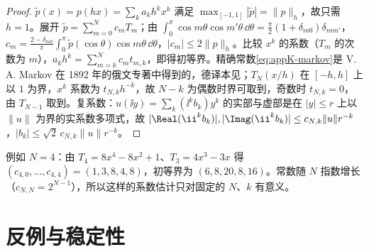 \begin{proof}
$\tilde p(x)=p(hx)=\sum_ka_kh^kx^k$ 满足 $\max_{[-1,1]}|\tilde p|=\|p\|_h$，故只需 $h=1$。展开 $\tilde p=\sum_{m=0}^Nc_mT_m$；由 $\int_0^\pi\cos m\theta\cos m'\theta\,\dd\theta=\frac\pi2(1+\delta_{m0})\delta_{mm'}$，$c_m=\frac{2-\delta_{m0}}{\pi}\int_0^\pi\tilde p(\cos\theta)\cos m\theta\,\dd\theta$，$|c_m|\le2\|p\|_h$。比较 $x^k$ 的系数（$T_m$ 的次数为 $m$），$a_kh^k=\sum_{m=k}^Nc_mt_{m,k}$，即得初等界。精确常数\cref{eq:appK-markov}是 V. A. Markov 在 1892 年的俄文专著中得到的，德译本见\cite{Markoff1916}；$T_N(x/h)$ 在 $[-h,h]$ 上以 $1$ 为界，$x^k$ 系数为 $t_{N,k}h^{-k}$，故 $N-k$ 为偶数时界可取到，奇数时 $t_{N,k}=0$，由 $T_{N-1}$ 取到。复系数：$u(\ii y)=\sum_k(\ii^kb_k)y^k$ 的实部与虚部是在 $|y|\le r$ 上以 $\|u\|$ 为界的实系数多项式，故 $|\Real(\ii^kb_k)|,|\Imag(\ii^kb_k)|\le c_{N,k}\|u\|r^{-k}$，$|b_k|\le\sqrt2\,c_{N,k}\|u\|r^{-k}$。
\end{proof}

例如 $N=4$：由 $T_4=8x^4-8x^2+1$、$T_3=4x^3-3x$ 得 $(c_{4,0},\dots,c_{4,4})=(1,3,8,4,8)$，初等界为 $(6,8,20,8,16)$。常数随 $N$ 指数增长（$c_{N,N}=2^{N-1}$），所以这样的系数估计只对固定的 $N$、$k$ 有意义。

\section{反例与稳定性}\label{sec:appK-counterexamples}

